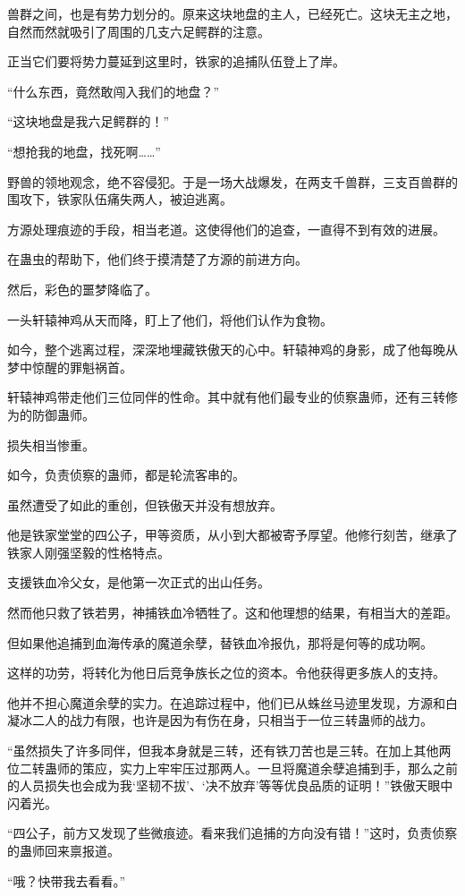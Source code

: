 \begin{this_body}
兽群之间，也是有势力划分的。原来这块地盘的主人，已经死亡。这块无主之地，自然而然就吸引了周围的几支六足鳄群的注意。

正当它们要将势力蔓延到这里时，铁家的追捕队伍登上了岸。

“什么东西，竟然敢闯入我们的地盘？”

“这块地盘是我六足鳄群的！”

“想抢我的地盘，找死啊……”

野兽的领地观念，绝不容侵犯。于是一场大战爆发，在两支千兽群，三支百兽群的围攻下，铁家队伍痛失两人，被迫逃离。

方源处理痕迹的手段，相当老道。这使得他们的追查，一直得不到有效的进展。

在蛊虫的帮助下，他们终于摸清楚了方源的前进方向。

然后，彩色的噩梦降临了。

一头轩辕神鸡从天而降，盯上了他们，将他们认作为食物。

如今，整个逃离过程，深深地埋藏铁傲天的心中。轩辕神鸡的身影，成了他每晚从梦中惊醒的罪魁祸首。

轩辕神鸡带走他们三位同伴的性命。其中就有他们最专业的侦察蛊师，还有三转修为的防御蛊师。

损失相当惨重。

如今，负责侦察的蛊师，都是轮流客串的。

虽然遭受了如此的重创，但铁傲天并没有想放弃。

他是铁家堂堂的四公子，甲等资质，从小到大都被寄予厚望。他修行刻苦，继承了铁家人刚强坚毅的性格特点。

支援铁血冷父女，是他第一次正式的出山任务。

然而他只救了铁若男，神捕铁血冷牺牲了。这和他理想的结果，有相当大的差距。

但如果他追捕到血海传承的魔道余孽，替铁血冷报仇，那将是何等的成功啊。

这样的功劳，将转化为他日后竞争族长之位的资本。令他获得更多族人的支持。

他并不担心魔道余孽的实力。在追踪过程中，他们已从蛛丝马迹里发现，方源和白凝冰二人的战力有限，也许是因为有伤在身，只相当于一位三转蛊师的战力。

“虽然损失了许多同伴，但我本身就是三转，还有铁刀苦也是三转。在加上其他两位二转蛊师的策应，实力上牢牢压过那两人。一旦将魔道余孽追捕到手，那么之前的人员损失也会成为我‘坚韧不拔’、‘决不放弃’等等优良品质的证明！”铁傲天眼中闪着光。

“四公子，前方又发现了些微痕迹。看来我们追捕的方向没有错！”这时，负责侦察的蛊师回来禀报道。

“哦？快带我去看看。”


\end{this_body}
